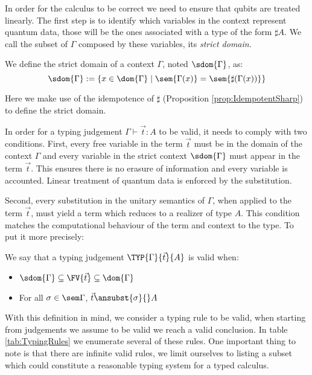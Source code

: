 In order for the calculus to be correct we need to ensure that qubits are treated linearly. The first step is to identify which variables in the context represent quantum data, those will be the ones associated with a type of the form $\sharp A$. We call the subset of $\Gamma$ composed by these variables, its \emph{strict domain}. 

\begin{definition}
    We define the strict domain of a context $\Gamma$, noted $\sdom{\Gamma}$, as:
    \[
    \sdom{\Gamma} := \{x\in\dom{\Gamma} \mid \sem{\Gamma(x)}=\sem{\sharp(\Gamma(x))}\}
    \]
\end{definition}

Here we make use of the idempotence of $\sharp$ (Proposition \ref{prop:IdempotentSharp}) to define the strict domain. 

In order for a typing judgement $\Gamma\vdash \vec{t}: A$ to be valid, it needs to comply with two conditions. First, every free variable in the term $\vec{t}$ must be in the domain of the context $\Gamma$ and every variable in the strict context $\sdom{\Gamma}$ must appear in the term $\vec{t}$. This ensures there is no erasure of information and every variable is accounted. Linear treatment of quantum data is enforced by the substitution.

Second, every substitution in the unitary semantics of $\Gamma$, when applied to the term $\vec{t}$, must yield a term which reduces to a realizer of type $A$. This condition matches the computational behaviour of the term and context to the type. To put it more precisely: 

\begin{definition}
    We say that a typing judgement $\TYP{\Gamma}{\vec t}{A}$ is valid when:
    \begin{itemize}
        \item $\sdom{\Gamma}\subseteq\FV{\vec t}\subseteq \dom{\Gamma}$
        \item For all $\sigma\in\sem\Gamma$, $\vec{t}\ansubst{\sigma}{}\real A$
    \end{itemize}
\end{definition}

With this definition in mind, we consider a typing rule to be valid, when starting from judgements we assume to be valid we reach a valid conclusion. In table \ref{tab:TypingRules} we enumerate several of these rules. One important thing to note is that there are infinite valid rules, we limit ourselves to listing a subset which could constitute a reasonable typing system for a typed calculus.

